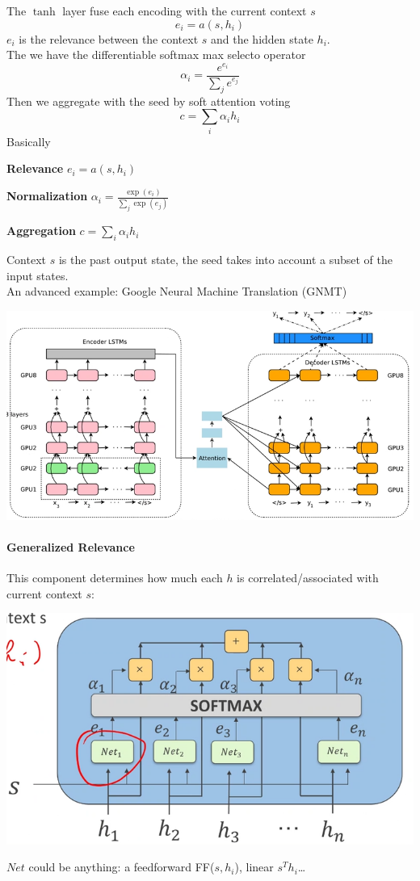 \documentclass[10pt]{report}
\begin{document}
The $\tanh$ layer fuse each encoding with the current context $s$
$$e_i = a(s, h_i)$$
$e_i$ is the relevance between the context $s$ and the hidden state $h_i$.\\
The we have the differentiable softmax max selecto operator
$$\alpha_i = \frac{e^{e_i}}{\sum_j e^{e_j}}$$
Then we aggregate with the seed by soft attention voting
$$c= \sum_i \alpha_ih_i$$
Basically
\begin{list}{}{}
	\item \textbf{Relevance} $e_i = a(s, h_i)$
	\item \textbf{Normalization} $\alpha_i = \frac{\exp(e_i)}{\sum_j \exp(e_j)}$
	\item \textbf{Aggregation} $c= \sum_i \alpha_ih_i$
\end{list}
Context $s$ is the past output state, the seed takes into account a subset of the input states.\\
An advanced example: Google Neural Machine Translation (GNMT)
\begin{center}
	\includegraphics[scale=0.5]{115.png}
\end{center}
\paragraph{Generalized Relevance} This component determines how much each $h$ is correlated/associated with current context $s$:
\begin{center}
	\includegraphics[scale=0.5]{116.png}
\end{center}
$Net$ could be anything: a feedforward FF($s, h_i$), linear $s^Th_i$\ldots
\end{document}
